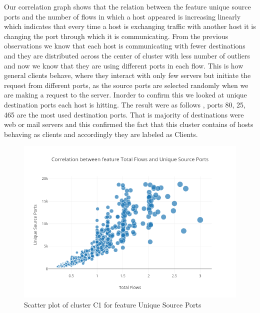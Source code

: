 Our correlation graph  shows that the relation between the feature unique source ports and the number of flows in which a host appeared is increasing linearly which indicates that every time a host is exchanging traffic with another host it is changing the port through which it is communicating. From the previous observations we know that each host is communicating with fewer destinations and they are distributed across the center of cluster with less number of outliers and now we know that they are using different ports in each flow. This is how general clients behave, where they interact with only few servers but initiate the request from different ports, as the source ports are selected randomly when we are making a request to the server. Inorder to confirm this we looked at unique destination ports each host is hitting. The result were as follows , ports 80, 25, 465 are the most used destination ports. That is majority of destinations were web or mail servers and this confirmed the fact that this cluster contains of hosts behaving as clients and accordingly they are labeled as Clients.

\begin{figure}[b]
	\centerline{
		\includegraphics[scale = 0.6]{c1_sourceports.png}
	}
	\caption{Scatter plot of cluster C1 for feature Unique Source Ports}%
\end{figure}


